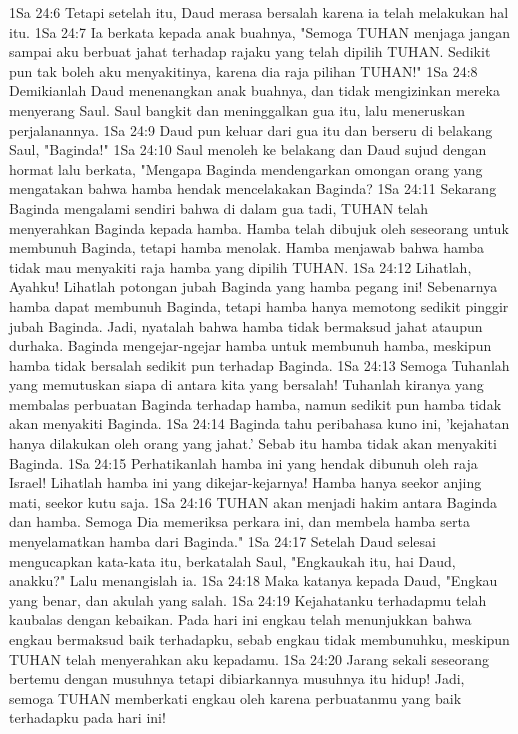 1Sa 24:6  Tetapi setelah itu, Daud merasa bersalah karena ia telah melakukan hal itu.
1Sa 24:7  Ia berkata kepada anak buahnya, "Semoga TUHAN menjaga jangan sampai aku berbuat jahat terhadap rajaku yang telah dipilih TUHAN. Sedikit pun tak boleh aku menyakitinya, karena dia raja pilihan TUHAN!"
1Sa 24:8  Demikianlah Daud menenangkan anak buahnya, dan tidak mengizinkan mereka menyerang Saul. Saul bangkit dan meninggalkan gua itu, lalu meneruskan perjalanannya.
1Sa 24:9  Daud pun keluar dari gua itu dan berseru di belakang Saul, "Baginda!"
1Sa 24:10  Saul menoleh ke belakang dan Daud sujud dengan hormat lalu berkata, "Mengapa Baginda mendengarkan omongan orang yang mengatakan bahwa hamba hendak mencelakakan Baginda?
1Sa 24:11  Sekarang Baginda mengalami sendiri bahwa di dalam gua tadi, TUHAN telah menyerahkan Baginda kepada hamba. Hamba telah dibujuk oleh seseorang untuk membunuh Baginda, tetapi hamba menolak. Hamba menjawab bahwa hamba tidak mau menyakiti raja hamba yang dipilih TUHAN.
1Sa 24:12  Lihatlah, Ayahku! Lihatlah potongan jubah Baginda yang hamba pegang ini! Sebenarnya hamba dapat membunuh Baginda, tetapi hamba hanya memotong sedikit pinggir jubah Baginda. Jadi, nyatalah bahwa hamba tidak bermaksud jahat ataupun durhaka. Baginda mengejar-ngejar hamba untuk membunuh hamba, meskipun hamba tidak bersalah sedikit pun terhadap Baginda.
1Sa 24:13  Semoga Tuhanlah yang memutuskan siapa di antara kita yang bersalah! Tuhanlah kiranya yang membalas perbuatan Baginda terhadap hamba, namun sedikit pun hamba tidak akan menyakiti Baginda.
1Sa 24:14  Baginda tahu peribahasa kuno ini, 'kejahatan hanya dilakukan oleh orang yang jahat.' Sebab itu hamba tidak akan menyakiti Baginda.
1Sa 24:15  Perhatikanlah hamba ini yang hendak dibunuh oleh raja Israel! Lihatlah hamba ini yang dikejar-kejarnya! Hamba hanya seekor anjing mati, seekor kutu saja.
1Sa 24:16  TUHAN akan menjadi hakim antara Baginda dan hamba. Semoga Dia memeriksa perkara ini, dan membela hamba serta menyelamatkan hamba dari Baginda."
1Sa 24:17  Setelah Daud selesai mengucapkan kata-kata itu, berkatalah Saul, "Engkaukah itu, hai Daud, anakku?" Lalu menangislah ia.
1Sa 24:18  Maka katanya kepada Daud, "Engkau yang benar, dan akulah yang salah.
1Sa 24:19  Kejahatanku terhadapmu telah kaubalas dengan kebaikan. Pada hari ini engkau telah menunjukkan bahwa engkau bermaksud baik terhadapku, sebab engkau tidak membunuhku, meskipun TUHAN telah menyerahkan aku kepadamu.
1Sa 24:20  Jarang sekali seseorang bertemu dengan musuhnya tetapi dibiarkannya musuhnya itu hidup! Jadi, semoga TUHAN memberkati engkau oleh karena perbuatanmu yang baik terhadapku pada hari ini!
